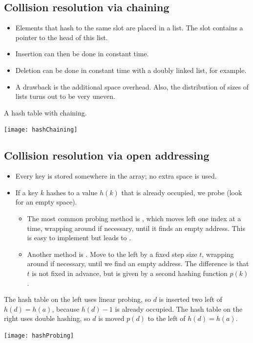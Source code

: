 \subsection{Collision resolution via chaining}
\begin{itemize}
\item Elements that hash to the same slot are placed in a list. 
The slot contains a pointer to the head of this list. 
\item Insertion can then be done in constant time. 
\item Deletion can be done in constant time with a doubly linked list, for example. 
\item A drawback is the additional space overhead. Also, the distribution of 
sizes of lists turns out to be very uneven.
\end{itemize}

\begin{Boxample}
A hash table with chaining.
\begin{center}
\texttt{[image: hashChaining]} 
\end{center}
\label{ex:chaining}
\end{Boxample}


\subsection{Collision resolution via open addressing}
\begin{itemize}
	\item Every key is stored somewhere in the array; no extra space is used.
	\item If a key  $k$ hashes to a value $h(k)$ that is already occupied, 
	we probe (look for an empty space). 
	\begin{itemize}
		\item The most common probing method is , which moves left
		 one index at a time, wrapping around if necessary, until it finds an empty 
		 address. This is easy to implement but leads to .
		\item Another method is . Move to the left by a
		fixed step size $t$, wrapping around if necessary, until we find an
		empty address. The difference is that $t$ is not fixed in advance, but
		is given by a second hashing function $p(k)$.
	\end{itemize}
\end{itemize}

\begin{Boxample}
The hash table on the left uses linear probing, so $d$ is inserted two left of $h(d) = h(a)$, because $h(d)-1$ is already occupied.
The hash table on the right uses double hashing, so $d$ is moved $p(d)$ to the left of $h(d) = h(a)$. 
\begin{center}
\texttt{[image: hashProbing]} 
\end{center}
\label{ex:probing}
\end{Boxample}

